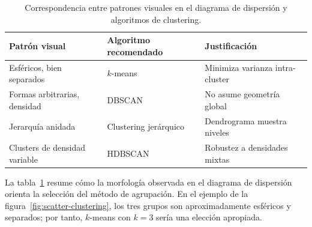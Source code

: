 \begin{table}[H]
    \centering
    \small
    \begin{tabular}{@{}p{3.5cm}p{3.8cm}p{5.8cm}@{}}
        \toprule
        \textbf{Patrón visual} & \textbf{Algoritmo recomendado} & \textbf{Justificación} \\
        \midrule
        Esféricos, bien separados & $k$-means & Minimiza varianza intra-cluster \\
        Formas arbitrarias, densidad & DBSCAN & No asume geometría global \\
        Jerarquía anidada & Clustering jerárquico & Dendrograma muestra niveles \\
        Clusters de densidad variable & HDBSCAN & Robustez a densidades mixtas \\
        \bottomrule
    \end{tabular}
    \caption{Correspondencia entre patrones visuales en el diagrama de dispersión y algoritmos de clustering.}
    \label{tab:scatter-algorithms}
\end{table}

La tabla~\ref{tab:scatter-algorithms} resume cómo la morfología observada en el diagrama de dispersión orienta la selección del método de agrupación. En el ejemplo de la figura~\ref{fig:scatter-clustering}, los tres grupos son aproximadamente esféricos y separados; por tanto, $k$-means con $k=3$ sería una elección apropiada.
